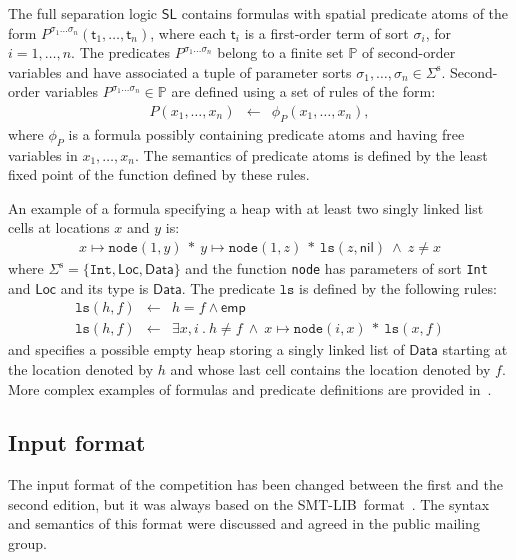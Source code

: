 \documentclass[orivec]{llncs}
\newcommand{\ssorts}[1]{#1^\mathrm{s}}
\newcommand{\locs}{\mathsf{Loc}}
\newcommand{\data}{\mathsf{Data}}
\newcommand{\nil}{\mathsf{nil}}
\newcommand{\emp}{\mathsf{emp}}
\newcommand{\seplog}{\mathsf{SL}}
\newcommand{\tterm}{\mathsf{t}}
\newcommand{\preds}{\mathbb{P}}
\newcommand{\ls}{\mathtt{ls}}
\newcommand{\smtlib}{\textsf{SMT-LIB}}
\begin{document}
The full separation logic $\seplog$ contains formulas with 
spatial predicate atoms of the form 
$P^{\sigma_1 \ldots \sigma_n}(\tterm_1, \ldots, \tterm_n)$, 
where each $\tterm_i$ is a first-order term of sort $\sigma_i$, for
$i=1,\ldots,n$.
The predicates $P^{\sigma_1 \ldots \sigma_n}$ belong to 
a finite set $\preds$ of second-order variables 
and have associated a tuple of parameter sorts 
$\sigma_1, \ldots, \sigma_n \in \ssorts{\Sigma}$. 
Second-order variables $P^{\sigma_1 \ldots \sigma_n} \in \preds$ 
are defined using a set of rules of the form: 
\begin{eqnarray}
P(x_1,\ldots,x_n) & \leftarrow & \phi_P(x_1,\ldots,x_n),
\label{eqn:rule}
\end{eqnarray}
where $\phi_P$ is a formula possibly containing predicate atoms 
and having free variables in $x_1,\ldots,x_n$.
The semantics of predicate atoms is defined by the least fixed point of
the function defined by these rules.

An example of a formula specifying a heap with at least two singly linked
list cells at locations $x$ and $y$ is:
\begin{eqnarray}
x \mapsto \texttt{node}(1,y) \ * \ y \mapsto \texttt{node}(1,z)  \ * \ \ls(z,\nil)
\ \wedge \ z \neq x
\label{eqn:two-list}
\end{eqnarray}
where $\ssorts{\Sigma} = \{\texttt{Int},\locs,\data\}$ and
the function \texttt{node} has parameters of sort \texttt{Int} and $\locs$ and its type is $\data$. 
The predicate $\ls$ is defined by the following rules:
\begin{eqnarray}
\ls(h,f) & \leftarrow & h = f \land \emp 
\label{eqn:ls-emp}
\\
\ls(h,f) & \leftarrow & 
		\exists x,i~.~ h \neq f \ \wedge\ 
			x \mapsto \texttt{node}(i,x) \ * \ \ls(x,f)\label{eqn:ls-cons}
\end{eqnarray}
and specifies a possible empty heap storing a singly linked list of $\data$ 
starting at the location denoted by $h$ and 
whose last cell contains the location denoted by $f$.
More complex examples of formulas and predicate definitions are provided in~\cite{SighireanuC14,IosifSRS18}.


\subsection{Input format}
\label{ssec:bench-format}

The input format of the competition has been changed between the first and the second edition, but it was always based on the \smtlib\ format~\cite{BarST-SMTLIB}.
The syntax and semantics of this format were discussed and agreed 
in the public mailing group. 
\end{document}
